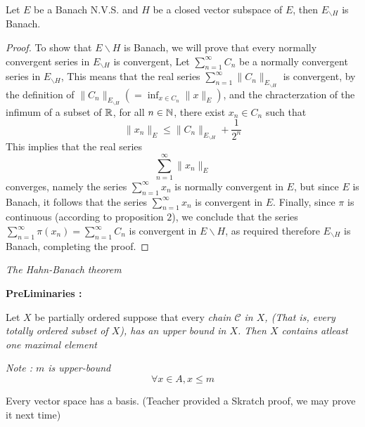 \begin{theorem}[]
Let $E $ be a Banach N.V.S. and $H $ be a closed vector subspace
of $E $, then $E_{ \backslash H} $  is Banach.
\end{theorem}
\begin{proof}
To show that $E \backslash H $  is Banach, we will prove that every
normally convergent series in $E_{ \backslash H}  $  
is convergent, Let 
$\sum_{n=1}^{\infty }C_{n}  $  be a normally convergent series in 
$E_{ \backslash H}  $, This means that the real series 
$\sum_{n=1}^{\infty } \| C_{n} \| _{E_{ \backslash H} } $  
is convergent, by the definition of $\| C_{n} \| _{E_{ \backslash H} } (=
\inf_{x \in C_{n}}  \| x \| _{E} )$, and the chracterzation of the 
infimum of a subset of $\mathbb{R}  $, for all $n \in \mathbb{N}$, there exist 
$x_{n} \in  C_{n} $  such that 
\[
\| x_{n} \|  _{E} 
\leq \| C_{n} \| _{E_{ \backslash H} } + 
\frac{1}{2^n }
\]
This implies that the real series 
\[
\sum_{n=1}^{\infty } \| x_{n} \| _{E}
\]
converges, namely the series  
$\sum_{n=1}^{\infty } x_{n} $  is normally convergent
in $E $, but since $E $ is Banach, it follows that the series
$\sum_{n=1}^{\infty } x_{n} $  is convergent in $E $. Finally,
since $\pi  $ is continuous (according to proposition $2 $), we conclude
that the series $\sum_{n=1}^{\infty } \pi (x_{n}) =
\sum_{n=1}^{\infty } C_{n}$ is convergent in $E \backslash H $, as required
therefore $E_{ \backslash H}  $  is Banach, completing the proof.
\end{proof}




\begin{center}
	\it The Hahn-Banach theorem \normalfont
\end{center}
\textbf{PreLiminaries : } 
\begin{theorem}
	Let $X $ be partially ordered
	suppose that every \it chain \normalfont $\mathcal{C}$ in $X $, 
	(That is, every totally ordered subset of $X $), 
	has an upper bound in $X$. Then $X $ contains atleast one
	maximal element 
\end{theorem}
\divider
\it Note : \normalfont  $m $ is upper-bound
\[
\forall x \in A, x \leq m 
\]
\divider
\begin{example}
\begin{theorem}[]
	Every vector space has a basis. (Teacher provided a Skratch proof, we
	may prove it next time)
\end{theorem}
\end{example}
% 



%
%




